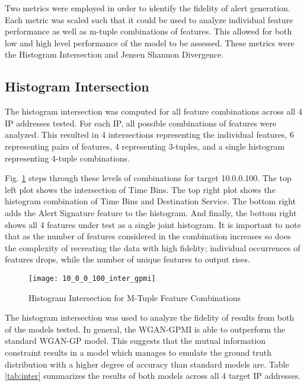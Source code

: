 Two metrics were employed in order to identify the fidelity of alert generation. Each metric was scaled such that it could be used to analyze individual feature performance as well as m-tuple combinations of features. This allowed for both low and high level performance of the model to be assessed. These metrics were the Histogram Intersection and Jensen Shannon Divergence.

\subsection{Histogram Intersection}
\label{sec:inter}

The histogram intersection was computed for all feature combinations across all 4 IP addresses tested. For each IP, all possible combinations of features were analyzed. This resulted in 4 intersections representing the individual features, 6 representing pairs of features, 4 representing 3-tuples, and a single histogram representing 4-tuple combinations.

Fig. \ref{fig:inter} steps through these levels of combinations for target 10.0.0.100. The top left plot shows the intersection of Time Bins. The top right plot shows the histogram combination of Time Bins and Destination Service. The bottom right adds the Alert Signature feature to the histogram. And finally, the bottom right shows all 4 features under test as a single joint histogram. It is important to note that as the number of features considered in the combination increases so does the complexity of recreating the data with high fidelity; individual occurrences of features drops, while the number of unique features to output rises.


\begin{figure}[!htbp]
	\centering
	\texttt{[image: 10\_0\_0\_100\_inter\_gpmi]}
	\caption{
		Histogram Intersection for M-Tuple Feature Combinations
	}
	\label{fig:inter}
\end{figure}

The histogram intersection was used to analyze the fidelity of results from both of the models tested. In general, the WGAN-GPMI is able to outperform the standard WGAN-GP model. This suggests that the mutual information constraint results in a model which manages to emulate the ground truth distribution with a higher degree of accuracy than standard models are. Table \ref{tab:inter} summarizes the results of both models across all 4 target IP addresses.

